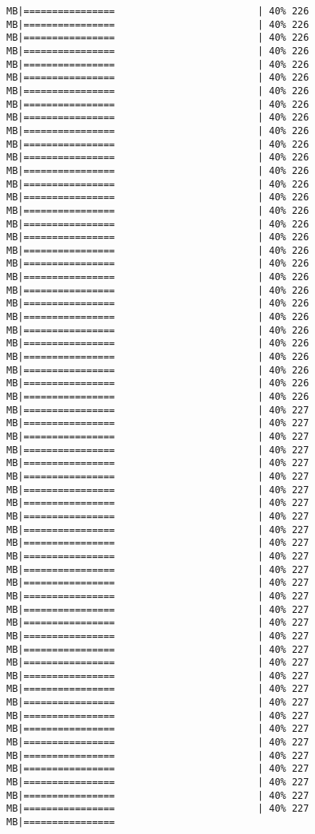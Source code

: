 \documentclass[
]{article}
\begin{document}
\begin{verbatim}
MB|================                         | 40% 226 MB|================                         | 40% 226 MB|================                         | 40% 226 MB|================                         | 40% 226 MB|================                         | 40% 226 MB|================                         | 40% 226 MB|================                         | 40% 226 MB|================                         | 40% 226 MB|================                         | 40% 226 MB|================                         | 40% 226 MB|================                         | 40% 226 MB|================                         | 40% 226 MB|================                         | 40% 226 MB|================                         | 40% 226 MB|================                         | 40% 226 MB|================                         | 40% 226 MB|================                         | 40% 226 MB|================                         | 40% 226 MB|================                         | 40% 226 MB|================                         | 40% 226 MB|================                         | 40% 226 MB|================                         | 40% 226 MB|================                         | 40% 226 MB|================                         | 40% 226 MB|================                         | 40% 226 MB|================                         | 40% 226 MB|================                         | 40% 226 MB|================                         | 40% 226 MB|================                         | 40% 226 MB|================                         | 40% 226 MB|================                         | 40% 227 MB|================                         | 40% 227 MB|================                         | 40% 227 MB|================                         | 40% 227 MB|================                         | 40% 227 MB|================                         | 40% 227 MB|================                         | 40% 227 MB|================                         | 40% 227 MB|================                         | 40% 227 MB|================                         | 40% 227 MB|================                         | 40% 227 MB|================                         | 40% 227 MB|================                         | 40% 227 MB|================                         | 40% 227 MB|================                         | 40% 227 MB|================                         | 40% 227 MB|================                         | 40% 227 MB|================                         | 40% 227 MB|================                         | 40% 227 MB|================                         | 40% 227 MB|================                         | 40% 227 MB|================                         | 40% 227 MB|================                         | 40% 227 MB|================                         | 40% 227 MB|================                         | 40% 227 MB|================                         | 40% 227 MB|================                         | 40% 227 MB|================                         | 40% 227 MB|================                         | 40% 227 MB|================                         | 40% 227 MB|================                         | 40% 227 MB|================      
\end{verbatim}
\end{document}
